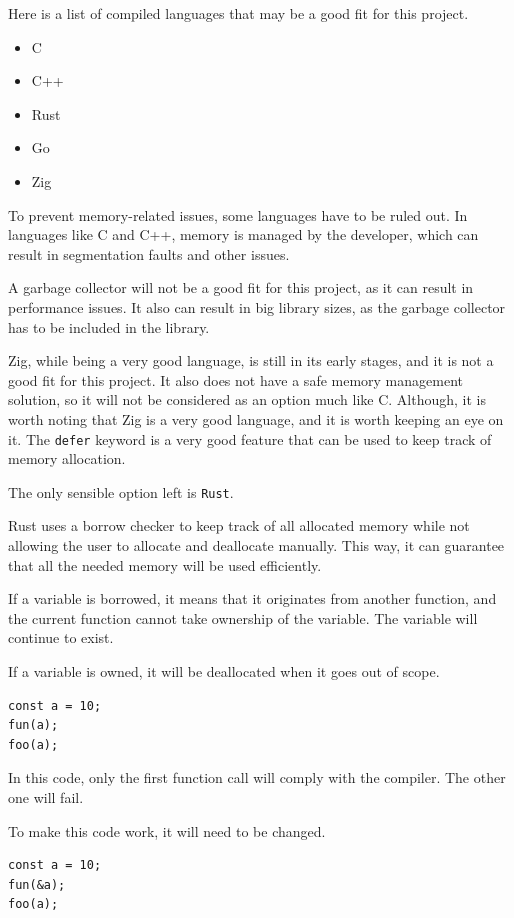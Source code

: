 \documentclass[10pt,journal,compsoc]{IEEEtran}
\begin{document}
Here is a list of compiled languages that may be a good fit for this project.

\begin{itemize}
    \item C
    \item C++
    \item Rust
    \item Go
    \item Zig
\end{itemize}

To prevent memory-related issues, some languages have to be ruled out. In languages like C and C++, memory is managed by the developer, which can result in segmentation faults and other issues.

A garbage collector will not be a good fit for this project, as it can result in performance issues. It also can result in big library sizes, as the garbage collector has to be included in the library.

Zig, while being a very good language, is still in its early stages, and it is not a good fit for this project. It also does not have a safe memory management solution, so it will not be considered as an option much like C. Although, it is worth noting that Zig is a very good language, and it is worth keeping an eye on it. The \verb|defer| keyword is a very good feature that can be used to keep track of memory allocation.

The only sensible option left is \verb|Rust|.

Rust uses a borrow checker to keep track of all allocated memory while not allowing the user to allocate and deallocate manually. This way, it can guarantee that all the needed memory will be used efficiently.

If a variable is borrowed, it means that it originates from another function, and the current function cannot take ownership of the variable. The variable will continue to exist.

If a variable is owned, it will be deallocated when it goes out of scope.

\begin{lstlisting}
const a = 10;
fun(a);
foo(a);
\end{lstlisting}

In this code, only the first function call will comply with the compiler. The other one will fail.

To make this code work, it will need to be changed.

\begin{lstlisting}
const a = 10;
fun(&a);
foo(a);
\end{lstlisting}
\end{document}
